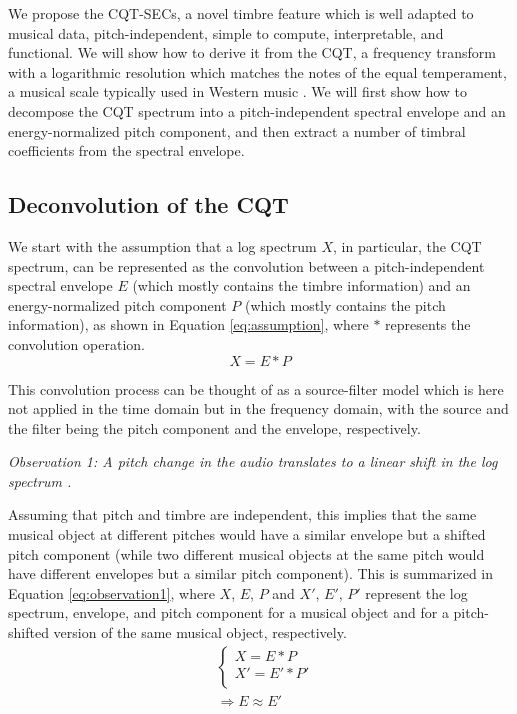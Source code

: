 \documentclass[journal]{IEEEtran}
\begin{document}
We propose the CQT-SECs, a novel timbre feature which is well adapted to musical data, pitch-independent, simple to compute, interpretable, and functional. We will show how to derive it from the CQT, a frequency transform with a logarithmic resolution which matches the notes of the equal temperament, a musical scale typically used in Western music \cite{brown1991, brown1992}. We will first show how to decompose the CQT spectrum into a pitch-independent spectral envelope and an energy-normalized pitch component, and then extract a number of timbral coefficients from the spectral envelope. 

\subsection{Deconvolution of the CQT}

We start with the assumption that a log spectrum $X$, in particular, the CQT spectrum, can be represented as the convolution between a pitch-independent spectral envelope $E$ (which mostly contains the timbre information) and an energy-normalized pitch component $P$ (which mostly contains the pitch information), as shown in Equation \ref{eq:assumption}, where $*$ represents the convolution operation. 
\begin{equation}
\label{eq:assumption}
X = E * P
\end{equation}

This convolution process can be thought of as a source-filter model \cite{fant1970} which is here not applied in the time domain but in the frequency domain, with the source and the filter being the pitch component and the envelope, respectively.

\emph{Observation 1: A pitch change in the audio translates to a linear shift in the log spectrum \cite{brown1991, brown1992}.}

Assuming that pitch and timbre are independent, this implies that the same musical object at different pitches would have a similar envelope but a shifted pitch component (while two different musical objects at the same pitch would have different envelopes but a similar pitch component). This is summarized in Equation \ref{eq:observation1}, where $X$, $E$, $P$ and $X'$, $E'$, $P'$ represent the log spectrum, envelope, and pitch component for a musical object and for a pitch-shifted version of the same musical object, respectively.
\begin{equation}
\label{eq:observation1}
\begin{split}
& \begin{cases}
X = E * P \\
X' = E' * P' \\
\end{cases} \\
& \Rightarrow E \approx E'
\end{split}
\end{equation}
\end{document}
